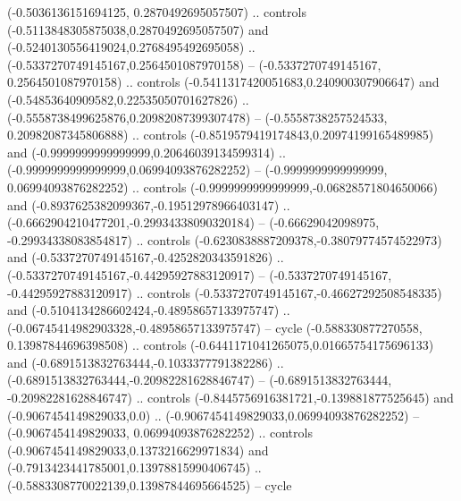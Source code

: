 {(-0.5036136151694125, 0.2870492695057507) .. controls (-0.5113848305875038,0.2870492695057507) and (-0.5240130556419024,0.2768495492695058) .. (-0.5337270749145167,0.2564501087970158) --
(-0.5337270749145167, 0.2564501087970158) .. controls (-0.5411317420051683,0.240900307906647) and (-0.54853640909582,0.22535050701627826) .. (-0.5558738499625876,0.20982087399307478) --
(-0.5558738257524533, 0.20982087345806888) .. controls (-0.8519579419174843,0.20974199165489985) and (-0.9999999999999999,0.20646039134599314) .. (-0.9999999999999999,0.06994093876282252) --
(-0.9999999999999999, 0.06994093876282252) .. controls (-0.9999999999999999,-0.06828571804650066) and (-0.8937625382099367,-0.19512978966403147) .. (-0.6662904210477201,-0.29934338090320184) --
(-0.66629042098975, -0.29934338083854817) .. controls (-0.6230838887209378,-0.38079774574522973) and (-0.5337270749145167,-0.4252820343591826) .. (-0.5337270749145167,-0.44295927883120917) --
(-0.5337270749145167, -0.44295927883120917) .. controls (-0.5337270749145167,-0.46627292508548335) and (-0.5104134286602424,-0.48958657133975747) .. (-0.06745414982903328,-0.48958657133975747) --
cycle (-0.588330877270558, 0.13987844696398508) .. controls (-0.6441171041265075,0.01665754175696133) and (-0.6891513832763444,-0.1033377791382286) .. (-0.6891513832763444,-0.20982281628846747) --
(-0.6891513832763444, -0.20982281628846747) .. controls (-0.8445756916381721,-0.139881877525645) and (-0.9067454149829033,0.0) .. (-0.9067454149829033,0.06994093876282252) --
(-0.9067454149829033, 0.06994093876282252) .. controls (-0.9067454149829033,0.1373216629971834) and (-0.7913423441785001,0.13978815990406745) .. (-0.5883308770022139,0.13987844695664525) --
cycle}

